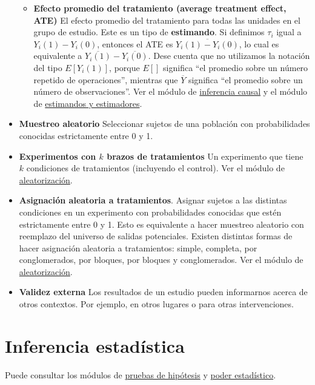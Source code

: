 \documentclass[12pt,spanish,]{book}
\providecommand{\tightlist}{%
  \setlength{\itemsep}{0pt}\setlength{\parskip}{0pt}}
\begin{document}
\begin{itemize}
  \begin{itemize}
  \tightlist
  \item
    \textbf{Efecto promedio del tratamiento (average treatment effect, ATE)} El efecto promedio del tratamiento para todas las unidades en el grupo de estudio. Este es un tipo de \textbf{estimando}. Si definimos \(\tau_i\) igual a \(Y_i(1)-Y_i(0)\), entonces el ATE es \(\overline{Y_i(1)-Y_i(0)}\), lo cual es equivalente a \(\overline{{Y}_i(1)}-\overline{{Y}_i(0)}\). Dese cuenta que no utilizamos la notación del tipo \(E[Y_i (1)]\), porque \(E[]\) significa ``el promedio sobre un número repetido de operaciones'', mientras que \(\overline{Y}\) significa ``el promedio sobre un número de observaciones''. Ver el módulo de \href{inferencia-causal.html}{inferencia causal} y el módulo de \href{estimandos-y-estimadores.html}{estimandos y estimadores}.
  \end{itemize}
\item
  \textbf{Muestreo aleatorio} Seleccionar sujetos de una población con
  probabilidades conocidas estrictamente entre 0 y 1.
\item
  \textbf{Experimentos con \(k\) brazos de tratamientos} Un experimento que tiene \(k\) condiciones de tratamientos
  (incluyendo el control). Ver el módulo de \href{aleatorizaciónn.html}{aleatorización}.
\item
  \textbf{Asignación aleatoria a tratamientos}. Asignar sujetos a las distintas condiciones en un experimento con probabilidades conocidas que estén estrictamente entre 0 y 1. Esto es equivalente a hacer muestreo aleatorio con reemplazo del universo de salidas potenciales. Existen distintas formas de hacer asignación aleatoria a tratamientos: simple, completa, por conglomerados, por bloques, por bloques y conglomerados. Ver el módulo de \href{aleatorización.html}{aleatorización}.
\item
  \textbf{Validez externa} Los resultados de un estudio pueden informarnos acerca de otros contextos. Por ejemplo, en otros lugares o para otras intervenciones.
\end{itemize}

\hypertarget{inferencia-estaduxedstica}{%
\section{Inferencia estadística}\label{inferencia-estaduxedstica}}

Puede consultar los módulos de \href{pruebas-de-hipótesis.html}{pruebas de hipótesis} y \href{poder-estadístico-y-diagnosticandos-del-diseño.html}{poder estadístico}.
\end{document}
